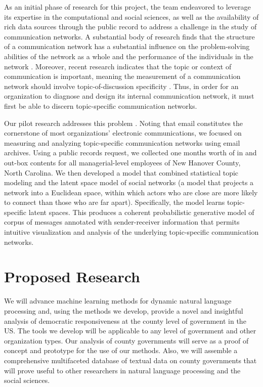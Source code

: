 As an initial phase of research for this project, the team endeavored to leverage its expertise in the computational and social sciences, as well as the availability of rich data sources through the public record to address a challenge in the study of communication networks. A substantial body of research finds that the structure of a communication network has a substantial influence on the problem-solving abilities of the network as a whole and the performance of the individuals in the network \cite{Mason2012}. Moreover, recent research indicates that the topic or context of communication is important, meaning the measurement of a communication network should involve topic-of-discussion specificity \cite{Mason2008}. Thus, in order for an organization to diagnose and design its internal communication network, it must first be able to discern topic-specific communication networks.

Our pilot research addresses this problem \cite{Krafft2012}. Noting that email constitutes the cornerstone of most organizations' electronic communications, we focused on measuring and analyzing topic-specific communication networks using email archives. Using a public records request, we collected one months worth of in and out-box contents for all managerial-level employees of New Hanover County, North Carolina. We then developed a model that combined statistical topic modeling and the latent space model of social networks (a model that projects a network into a Euclidean space, within which actors who are close are more likely to connect than those who are far apart). Specifically, the model learns topic-specific latent spaces. This produces a coherent probabilistic generative model of corpus of messages annotated with sender-receiver information that permits intuitive visualization and analysis of the underlying topic-specific communication networks.

\section{Proposed Research}

We will advance machine learning methods for dynamic natural language processing and, using the methods we develop, provide a novel and insightful analysis of democratic responsiveness at the county level of government in the US. The tools we develop will be applicable to any level of government and other organization types. Our analysis of county governments will serve as a proof of concept and prototype for the use of our methods. Also, we will assemble a comprehensive multifaceted database of textual data on county governments that will prove useful to other researchers in natural language processing and the social sciences.

